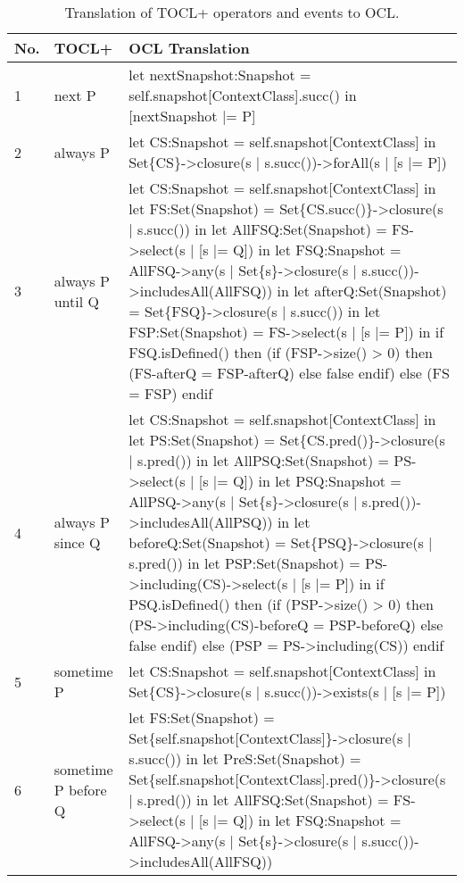 \begin{longtable}{|>{\footnotesize}p{0.6cm}|>{\scriptsize\raggedright\arraybackslash}p{4cm}|>{\scriptsize\raggedright\arraybackslash}p{\dimexpr\textwidth-4.6cm-4\tabcolsep-3\arrayrulewidth\relax}|}
    \caption{Translation of TOCL+ operators and events to OCL.}
    \label{tab:TOCL2OCL} \\
    \hline
    \textbf{No.} & \textbf{TOCL+} & \textbf{OCL Translation} \\
    \hline
    1 & 
    next P &
    let nextSnapshot:Snapshot = self.snapshot[ContextClass].succ() in [nextSnapshot |= P] \\
    \hline
    2 &
    always P &
    let CS:Snapshot = self.snapshot[ContextClass] in Set\{CS\}->closure(s | s.succ())->forAll(s | [s |= P]) \\
    \hline  
    3 &
    always P until Q &
    let CS:Snapshot = self.snapshot[ContextClass]
    in let FS:Set(Snapshot) = Set\{CS.succ()\}->closure(s | s.succ())
    in let AllFSQ:Set(Snapshot) = FS->select(s | [s |= Q])
    in let FSQ:Snapshot = AllFSQ->any(s | Set\{s\}->closure(s | s.succ())->includesAll(AllFSQ))
    in let afterQ:Set(Snapshot) = Set\{FSQ\}->closure(s | s.succ())
    in let FSP:Set(Snapshot) = FS->select(s | [s |= P])
    in if FSQ.isDefined() then (if (FSP->size() > 0) then (FS-afterQ = FSP-afterQ) else false endif) else (FS = FSP) endif \\
    \hline
    4 &
    always P since Q &
    let CS:Snapshot = self.snapshot[ContextClass]
    in let PS:Set(Snapshot) = Set\{CS.pred()\}->closure(s | s.pred())
    in let AllPSQ:Set(Snapshot) = PS->select(s | [s |= Q])
    in let PSQ:Snapshot = AllPSQ->any(s | Set\{s\}->closure(s | s.pred())->includesAll(AllPSQ))
    in let beforeQ:Set(Snapshot) = Set\{PSQ\}->closure(s | s.pred())
    in let PSP:Set(Snapshot) = PS->including(CS)->select(s | [s |= P])
    in if PSQ.isDefined() then (if (PSP->size() > 0) then (PS->including(CS)-beforeQ = PSP-beforeQ) else false endif) else (PSP = PS->including(CS)) endif \\
    \hline
    5 &
    sometime P &
    let CS:Snapshot = self.snapshot[ContextClass] in Set\{CS\}->closure(s | s.succ())->exists(s | [s |= P]) \\
    \hline
    6 &
    sometime P before Q &
    let FS:Set(Snapshot) = Set\{self.snapshot[ContextClass]\}->closure(s | s.succ())
    in let PreS:Set(Snapshot) = Set\{self.snapshot[ContextClass].pred()\}->closure(s | s.pred())
    in let AllFSQ:Set(Snapshot) = FS->select(s | [s |= Q])
    in let FSQ:Snapshot = AllFSQ->any(s | Set\{s\}->closure(s | s.succ())->includesAll(AllFSQ))

\end{longtable}
